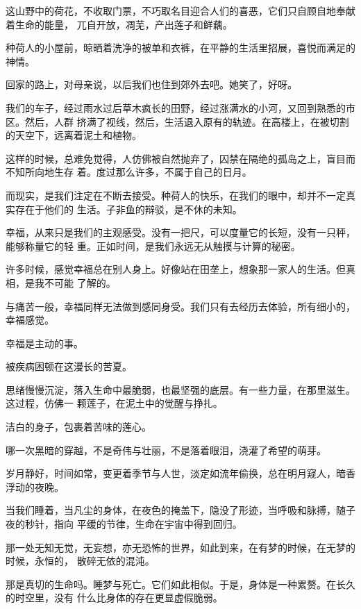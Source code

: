 		这山野中的荷花，不收取门票，不巧取名目迎合人们的喜恶，它们只自顾自地奉献着生命的能量，
	兀自开放，凋芜，产出莲子和鲜藕。

		种荷人的小屋前，晾晒着洗净的被单和衣裤，在平静的生活里招展，喜悦而满足的神情。

		回家的路上，对母亲说，以后我们也住到郊外去吧。她笑了，好呀。

		我们的车子，经过雨水过后草木疯长的田野，经过涨满水的小河，又回到熟悉的市区。然后，人群
	挤满了视线，然后，生活退入原有的轨迹。在高楼上，在被切割的天空下，远离着泥土和植物。

		这样的时候，总难免觉得，人仿佛被自然抛弃了，囚禁在隔绝的孤岛之上，盲目而不知所向地生存
	着。度过那么许多，不属于自己的日月。

		而现实，是我们注定在不断去接受。种荷人的快乐，在我们的眼中，却并不一定真实存在于他们的
	生活。子非鱼的辩驳，是不休的未知。

		幸福，从来只是我们的主观感受。没有一把尺，可以度量它的长短，没有一只秤，能够称量它的轻
	重。正如时间，是我们永远无从触摸与计算的秘密。

		许多时候，感觉幸福总在别人身上。好像站在田垄上，想象那一家人的生活。但真相，是我不可能
	了解的。

		与痛苦一般，幸福同样无法做到感同身受。我们只有去经历去体验，所有细小的，幸福感觉。

		幸福是主动的事。

		被疾病困顿在这漫长的苦夏。

		思绪慢慢沉淀，落入生命中最脆弱，也最坚强的底层。有一些力量，在那里滋生。这过程，仿佛一
	颗莲子，在泥土中的觉醒与挣扎。

		洁白的身子，包裹着苦味的莲心。

		哪一次黑暗的穿越，不是奇伟与壮丽，不是落着眼泪，浇灌了希望的萌芽。

	\endwriting



		岁月静好，时间如常，变更着季节与人世，淡定如流年偷换，总在明月窥人，暗香浮动的夜晚。

		当我们睡着，当凡尘的身体，在夜色的掩盖下，隐没了形迹，当呼吸和脉搏，随子夜的秒针，指向
	平缓的节律，生命在宇宙中得到回归。

		那一处无知无觉，无妄想，亦无恐怖的世界，如此到来，在有梦的时候，在无梦的时候，永恒的，
	散碎无依的混沌。


		那是真切的生命吗。睡梦与死亡。它们如此相似。于是，身体是一种累赘。在长久的时空里，没有
	什么比身体的存在更显虚假脆弱。

